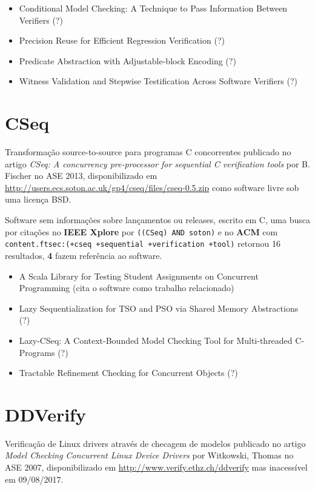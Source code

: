 \begin{itemize}
\item Conditional Model Checking: A Technique to Pass Information Between Verifiers (?)
\item Precision Reuse for Efficient Regression Verification (?)
\item Predicate Abstraction with Adjustable-block Encoding (?)
\item Witness Validation and Stepwise Testification Across Software Verifiers (?)
\end{itemize}

\section{CSeq}

Transformação source-to-source para programas C concorrentes
publicado no artigo {\it CSeq: A concurrency pre-processor for sequential C verification tools}
por B. Fischer
no ASE 2013,
disponibilizado em \url{http://users.ecs.soton.ac.uk/gp4/cseq/files/cseq-0.5.zip}
como software livre
sob uma licença BSD.

Software sem informações sobre lançamentos ou releases,
escrito em C,
uma busca por citações no {\bf IEEE Xplore} por
\texttt{((CSeq) AND soton)}
e no {\bf ACM} com
\texttt{content.ftsec:(+cseq +sequential +verification +tool)}
retornou
16 resultados,
{\bf 4} fazem referência ao software.

\begin{itemize}
\item A Scala Library for Testing Student Assignments on Concurrent Programming (cita o software como trabalho relacionado)
\item Lazy Sequentialization for TSO and PSO via Shared Memory Abstractions (?)
\item Lazy-CSeq: A Context-Bounded Model Checking Tool for Multi-threaded C-Programs (?)
\item Tractable Refinement Checking for Concurrent Objects (?)
\end{itemize}

\section{DDVerify}

Verificação de Linux drivers através de checagem de modelos
publicado no artigo {\it Model Checking Concurrent Linux Device Drivers}
por Witkowski, Thomas
no ASE 2007,
disponibilizado em \url{http://www.verify.ethz.ch/ddverify}
mas inacessível em 09/08/2017.

